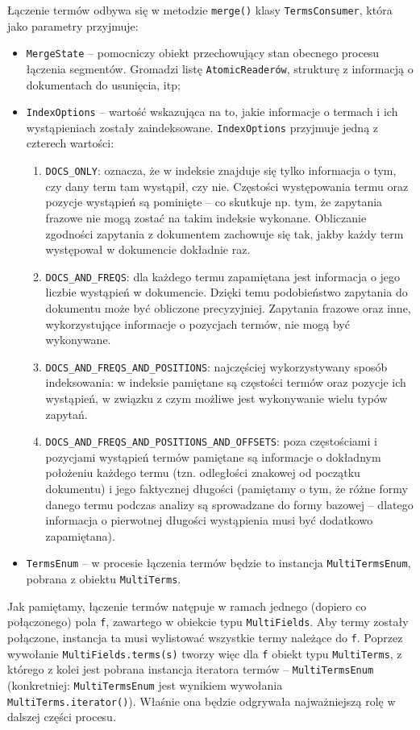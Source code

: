 Łączenie termów odbywa się w metodzie \texttt{merge()} klasy \texttt{TermsConsumer}, która jako parametry przyjmuje:
\begin{itemize}
 \item \texttt{MergeState} -- pomocniczy obiekt przechowujący stan obecnego procesu łączenia segmentów. Gromadzi listę \texttt{AtomicReaderów}, strukturę z informacją o dokumentach do usunięcia, itp;
 \item \texttt{IndexOptions} -- wartość wskazująca na to, jakie informacje o termach i ich wystąpieniach zostały zaindeksowane. \texttt{IndexOptions} przyjmuje jedną z czterech wartości:
 \begin{enumerate}
  \item \texttt{DOCS\_ONLY}: oznacza, że w indeksie znajduje się tylko informacja o tym, czy dany term tam wystąpił, czy nie. Częstości występowania termu oraz pozycje wystąpień są pominięte -- co skutkuje np. tym, że zapytania frazowe nie mogą zostać na takim indeksie wykonane. Obliczanie zgodności zapytania z dokumentem zachowuje się tak, jakby każdy term występował w dokumencie dokładnie raz.
  \item \texttt{DOCS\_AND\_FREQS}: dla każdego termu zapamiętana jest informacja o jego liczbie wystąpień w dokumencie. Dzięki temu podobieństwo zapytania do dokumentu może być obliczone precyzyjniej. Zapytania frazowe oraz inne, wykorzystujące informacje o pozycjach termów, nie mogą być wykonywane.
  \item \texttt{DOCS\_AND\_FREQS\_AND\_POSITIONS}: najczęściej wykorzystywany sposób indeksowania: w indeksie pamiętane są częstości termów oraz pozycje ich wystąpień, w związku z czym możliwe jest wykonywanie wielu typów zapytań.
  \item \texttt{DOCS\_AND\_FREQS\_AND\_POSITIONS\_AND\_OFFSETS}: poza częstościami i pozycjami wystąpień termów pamiętane są informacje o dokładnym położeniu każdego termu (tzn. odległości znakowej od początku dokumentu) i jego faktycznej długości (pamiętamy o tym, że różne formy danego termu podczas analizy są sprowadzane do formy bazowej -- dlatego informacja o pierwotnej długości wystąpienia musi być dodatkowo zapamiętana).
 \end{enumerate}
 \item \texttt{TermsEnum} -- w procesie łączenia termów będzie to instancja \texttt{MultiTermsEnum}, pobrana z obiektu \texttt{MultiTerms}.
\end{itemize}

Jak pamiętamy, łączenie termów natępuje w ramach jednego (dopiero co połączonego) pola \texttt{f}, zawartego w obiekcie typu \texttt{MultiFields}. Aby termy zostały połączone, instancja ta musi wylistować wszystkie termy należące do \texttt{f}. Poprzez wywołanie \texttt{MultiFields.terms(s)} tworzy więc dla \texttt{f} obiekt typu \texttt{MultiTerms}, z którego z kolei jest pobrana instancja iteratora termów -- \texttt{MultiTermsEnum} (konkretniej: \texttt{MultiTermsEnum} jest wynikiem wywołania \texttt{MultiTerms.iterator()}). Właśnie ona będzie odgrywała najważniejszą rolę w dalszej części procesu.

